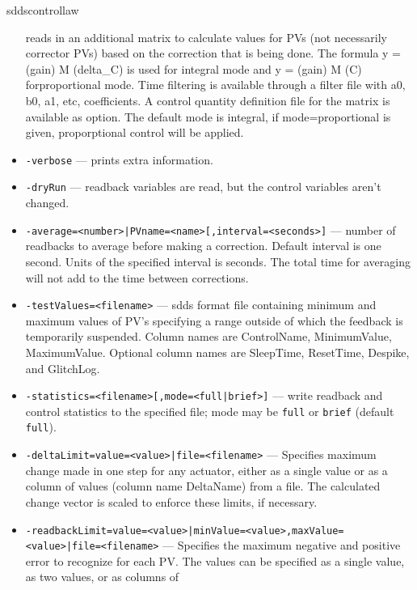 \begin{sddsprog}{sddscontrollaw}
\begin{itemize}
                reads in an additional matrix to calculate values for PVs
               (not necessarily corrector PVs) based
               on the correction that is being done. The formula 
               y = (gain) M (delta\_C) is used for integral mode and 
               y = (gain) M (C) forproportional mode. Time filtering 
               is available through a filter file with 
               a0, b0, a1, etc, coefficients. 
               A control quantity definition file for the matrix 
               is available as option. The default mode is integral, if 
               mode=proportional is given, proporptional control will be applied. 
        \item {\tt -verbose} --- prints extra information.
        \item {\tt -dryRun} --- readback variables are read, but the control variables
               aren't changed.
        \item {\tt -average=<number>|PVname=<name>[,interval=<seconds>]} ---  number of readbacks to average before making a correction.
               Default interval is one second. Units of the specified 
               interval is seconds. The total time for averaging will
               not add to the time between corrections.
        \item {\tt -testValues=<filename>} --- sdds format file containing minimum and maximum values
               of PV's specifying a range outside of which the feedback
               is temporarily suspended. Column names are ControlName,
               MinimumValue, MaximumValue. Optional column names are
               SleepTime, ResetTime, Despike, and GlitchLog.
        \item {\tt -statistics=<filename>[,mode=<full|brief>]} --- write readback and control statistics to the specified file; mode may be \verb|full| or \verb|brief| (default \verb|full|).
        \item {\tt -deltaLimit=value=<value>|file=<filename>} --- Specifies maximum change made in one step for any actuator,
               either as a single value or as a column of values (column name
               DeltaName) from a file. The calculated change vector is scaled
               to enforce these limits, if necessary.
        \item {\tt -readbackLimit=value=<value>|minValue=<value>,maxValue=<value>|file=<filename>} --- Specifies the maximum negative and positive error to
               recognize for each PV. The values can be specified
               as a single value, as two values, or as columns of

\end{itemize}
\end{sddsprog}

